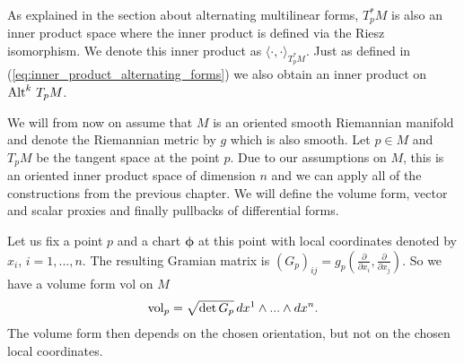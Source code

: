 \documentclass[../master_thesis.tex]{subfiles}
\begin{document}
As explained in the section about alternating multilinear forms, $T^*_p M$ is also an 
inner product space where the inner product is defined via the Riesz isomorphism.
We denote this inner product as $\langle \cdot, \cdot \rangle _{T^*_p M}$.
Just as defined in (\ref{eq:inner_product_alternating_forms}) 
we also obtain an inner product on 
${\operatorname{Alt}^{k}\,T_p M}$.

We will from now on assume that $M$ is an oriented smooth Riemannian manifold and 
denote the Riemannian metric by $g$ which is also smooth. 
Let $p \in M$ and $T_p M$ be the tangent space at the point $p$. 
Due to our assumptions on $M$, this is an oriented inner product space of 
dimension $n$ and we can apply 
all of the constructions from the previous chapter. 
We will define the volume form, vector and scalar proxies and finally pullbacks
of differential forms.

Let us fix a point $p$ and a chart $\boldsymbol{\phi}$ 
at this point with local coordinates denoted by $x_i$, $i=1,...,n$. 
The resulting Gramian matrix is
$(G_p)_{ij} = g_p(\frac{\partial}{\partial x_i},\frac{\partial}{\partial x_j})$.
So we have a volume form vol on $M$ 
\begin{align*}
    \operatorname{vol}_p = \sqrt{\det G_p} \,dx^1 \wedge ... \wedge dx^n.
\end{align*}
The volume form then depends on the chosen orientation, but not on the 
chosen local coordinates.


\end{document}
